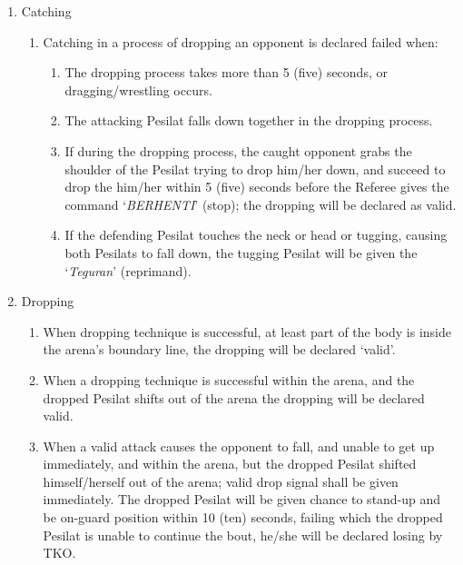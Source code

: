 \begin{legal}
\begin{legal}
\begin{legal}
\begin{enumerate}[label=\Alph*.]
                \item Catching
                    \begin{enumerate}[label*=\arabic*.]
                    \item Catching in a process of dropping an opponent is declared failed when:
                        \begin{enumerate}[label*=\arabic*.]
                        \item The dropping process takes more than 5 (five) seconds, or 
                            dragging/wrestling occurs.
                       \item The attacking Pesilat falls down together in the dropping process.
                        \item If during the dropping process, the caught opponent grabs the shoulder of the 
                           Pesilat trying to drop him/her down, and succeed to drop the him/her within 
                            5 (five) seconds before the Referee gives the command `\emph{BERHENTI}' (stop); 
                            the dropping will be declared as valid.
                        \item If the defending Pesilat touches the neck or head or tugging, causing both 
                            Pesilats to fall down, the tugging Pesilat will be given the `\emph{Teguran}' 
                            (reprimand).
                        \end{enumerate}
                    \end{enumerate}

                \item Dropping
                    \begin{enumerate}[label*=\arabic*.]
                    \item When dropping technique is successful, at least part of the body
                       is inside the arena’s boundary line, the dropping will be
                        declared `valid'.
                    \item When a dropping technique is successful within the arena, and
                        the dropped Pesilat shifts out of the arena the dropping will be
                       declared valid.
                    \item  When a valid attack causes the opponent to fall, and unable to get 
                        up immediately, and within the arena, but the dropped Pesilat shifted himself/herself 
                        out of the arena; valid drop signal shall be given immediately. The dropped Pesilat 
                       will be given chance to stand-up and be on-guard position within 10 (ten) seconds, 
                        failing which the dropped Pesilat is unable to continue the bout, he/she will be 
                        declared losing by TKO.
                    \end{enumerate}
                \end{enumerate}


\end{legal}
\end{legal}
\end{legal}
